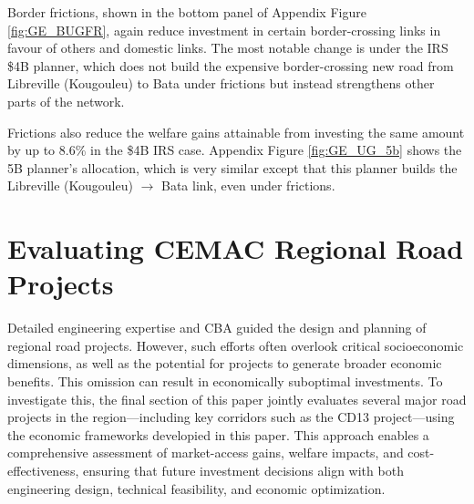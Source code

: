\documentclass[a4paper]{article}
\begin{document}
Border frictions, shown in the bottom panel of Appendix Figure \ref{fig:GE_BUGFR}, again reduce investment in certain border-crossing links in favour of others and domestic links. The most notable change is under the IRS \$4B planner, which does not build the expensive border-crossing new road from Libreville (Kougouleu) to Bata under frictions but instead strengthens other parts of the network. \newline

Frictions also reduce the welfare gains attainable from investing the same amount by up to 8.6\% in the \$4B IRS case. Appendix Figure \ref{fig:GE_UG_5b} shows the 5B planner's allocation, which is very similar except that this planner builds the Libreville (Kougouleu) $\to$ Bata link, even under frictions. \newline

\section{Evaluating CEMAC Regional Road Projects}

Detailed engineering expertise and CBA guided the design and planning of regional road projects. However, such efforts often overlook critical socioeconomic dimensions, as well as the potential for projects to generate broader economic benefits. This omission can result in economically suboptimal investments. 
To investigate this, the final section of this paper jointly evaluates several major road projects in the region—including key corridors such as the CD13 project—using the economic frameworks developied in this paper. This approach enables a comprehensive assessment of market-access gains, welfare impacts, and cost-effectiveness, ensuring that future investment decisions align with both engineering design, technical feasibility, and economic optimization. \newline 

\end{document}

